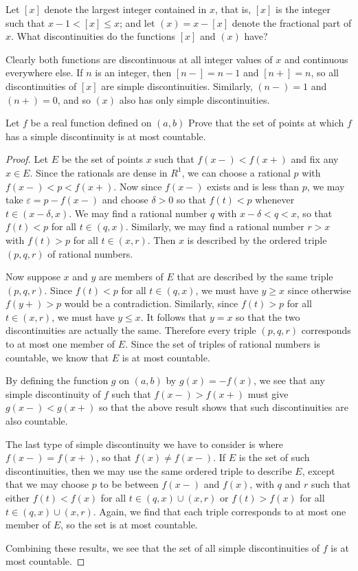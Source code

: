  Let $[x]$ denote the largest integer contained in $x$,
that is, $[x]$ is the integer such that $x - 1<[x]\leq x$; and let
$(x) = x - [x]$ denote the fractional part of $x$. What
discontinuities do the functions $[x]$ and $(x)$ have?
\begin{solution}
  Clearly both functions are discontinuous at all integer values of
  $x$ and continuous everywhere else. If $n$ is an integer, then
  $[n-] = n - 1$ and $[n+] = n$, so all discontinuities of $[x]$ are
  simple discontinuities. Similarly, $(n-) = 1$ and $(n+) = 0$, and so
  $(x)$ also has only simple discontinuities.
\end{solution}

 Let $f$ be a real function defined on $(a,b)$ Prove that
the set of points at which $f$ has a simple discontinuity is at most
countable.
\begin{proof}
  Let $E$ be the set of points $x$ such that $f(x-) < f(x+)$ and fix
  any $x\in E$. Since the rationals are dense in $R^1$, we can choose
  a rational $p$ with $f(x-) < p < f(x+)$. Now since $f(x-)$ exists
  and is less than $p$, we may take $\varepsilon = p - f(x-)$ and
  choose $\delta > 0$ so that $f(t) < p$ whenever
  $t\in(x - \delta, x)$. We may find a rational number $q$ with
  $x - \delta < q < x$, so that $f(t) < p$ for all
  $t\in(q,x)$. Similarly, we may find a rational number $r > x$ with
  $f(t) > p$ for all $t\in(x,r)$. Then $x$ is described by the ordered
  triple $(p,q,r)$ of rational numbers.

  Now suppose $x$ and $y$ are members of $E$ that are described by the
  same triple $(p,q,r)$. Since $f(t) < p$ for all $t\in(q,x)$, we must
  have $y\geq x$ since otherwise $f(y+) > p$ would be a
  contradiction. Similarly, since $f(t) > p$ for all $t\in(x,r)$, we
  must have $y\leq x$. It follows that $y = x$ so that the two
  discontinuities are actually the same. Therefore every triple
  $(p,q,r)$ corresponds to at most one member of $E$. Since the set of
  triples of rational numbers is countable, we know that $E$ is at
  most countable.

  By defining the function $g$ on $(a,b)$ by $g(x) = -f(x)$, we see
  that any simple discontinuity of $f$ such that $f(x-) > f(x+)$ must
  give $g(x-) < g(x+)$ so that the above result shows that such
  discontinuities are also countable.

  The last type of simple discontinuity we have to consider is where
  $f(x-) = f(x+)$, so that $f(x)\neq f(x-)$. If $E$ is the set of such
  discontinuities, then we may use the same ordered triple to describe
  $E$, except that we may choose $p$ to be between $f(x-)$ and $f(x)$,
  with $q$ and $r$ such that either $f(t) < f(x)$ for all
  $t\in(q,x)\cup(x,r)$ or $f(t) > f(x)$ for all
  $t\in(q,x)\cup(x,r)$. Again, we find that each triple corresponds to
  at most one member of $E$, so the set is at most countable.

  Combining these results, we see that the set of all simple
  discontinuities of $f$ is at most countable.
\end{proof}
